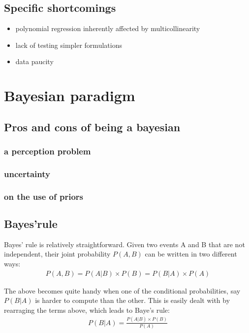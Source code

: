 \documentclass[10pt]{article}
\begin{document}
	\subsection{Specific shortcomings}
	\begin{itemize}
		\item polynomial regression inherently affected by multicollinearity
		\item lack of testing simpler formulations
		\item data paucity
	\end{itemize}
		
\section{Bayesian paradigm}
	\subsection{Pros and cons of being a bayesian}
		\subsubsection{a perception problem}
		\subsubsection{uncertainty}
		\subsubsection{on the use of priors}		
	\subsection{Bayes'rule}
	Bayes' rule is relatively straightforward. Given two events A and B that are not independent,
	their joint probability $P(A,B)$ can be written in two different ways:
	\begin{align}
		P(A,B) = P(A|B) \times P(B) = P(B|A)\times P(A)	
	\end{align}
	
	

	The above becomes quite handy when one of the conditional probabilities, say $P(B|A)$ is harder to compute than the other. This is easily dealt with by rearraging the terms above, which leads to Baye's rule:
	\begin{align}
		P(B|A)  = \frac{P(A|B) \times P(B)}{P(A)}
	\end{align}
	
\end{document}
